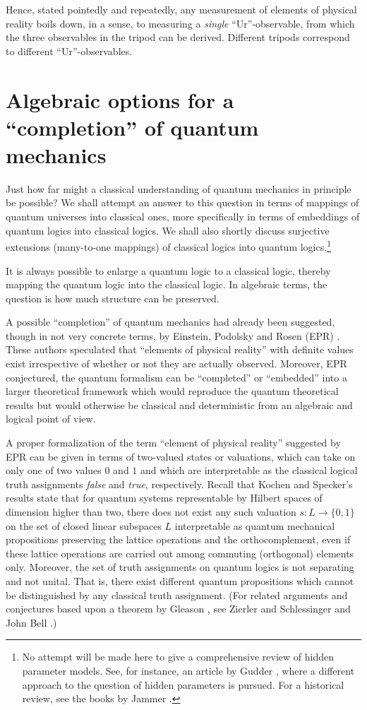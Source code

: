 \documentclass[%
  preprint,
 showpacs,
 showkeys,
 preprintnumbers,
 amsmath,amssymb,
 aps,
 rmp,
  longbibliography,
 ]{revtex4-1}
\begin{document}
Hence, stated pointedly and repeatedly, any measurement of elements of
physical reality boils down, in
a sense, to measuring a {\em single} ``Ur''-observable, from which the
three observables in the tripod can be derived. Different tripods
correspond to different ``Ur''-observables.

\section{Algebraic options for a ``completion'' of quantum mechanics}
Just how far might a classical understanding of quantum mechanics in
principle be possible?  We shall attempt an answer to this question in
terms of mappings of quantum universes into classical ones, more
specifically in terms of embeddings of quantum logics into classical
logics. We shall also shortly discuss surjective extensions (many-to-one
mappings) of classical logics into quantum logics.\footnote{
No attempt will be made here to give a comprehensive review of hidden
parameter models. See, for instance, an article by
Gudder
\cite{gudder1}, where
a different approach to the question of hidden parameters is pursued.
For a historical review, see the books by Jammer
\cite{jammer:66,jammer1}.}

It is always possible to enlarge a quantum logic to a classical
logic, thereby mapping the quantum logic into the classical logic. In
algebraic terms, the question  is how much structure can be preserved.

A possible ``completion'' of quantum mechanics had already been
suggested, though in not very
concrete terms, by Einstein, Podolsky and Rosen (EPR) \cite{epr}. These authors
speculated that ``elements of physical reality'' with definite values
exist irrespective
of whether or not they are actually observed. Moreover, EPR conjectured,
the
quantum formalism can be ``completed'' or ``embedded'' into a larger theoretical framework
which would reproduce the quantum theoretical results but would otherwise
be classical and deterministic from an algebraic and logical point of view.

A proper formalization of the term ``element of physical reality''
suggested by EPR can be given in terms of two-valued states or valuations,
which can take on only one of two values $0$ and $1$ and which are
interpretable as the classical logical truth assignments {\it false} and
{\it true}, respectively.  Recall that Kochen and Specker's results
\cite{kochen1} state that for quantum systems representable by Hilbert
spaces of dimension higher than two, there does not exist any such valuation
$s: L\rightarrow \{0,1\}$
on the set of closed linear subspaces $L$ interpretable as quantum
mechanical propositions preserving the lattice operations
and the orthocomplement,
even if these lattice operations are carried out among commuting
(orthogonal) elements only. Moreover,
the set of truth assignments on quantum logics is not
separating and not unital. That is, there exist  different quantum propositions
which cannot be distinguished by any classical truth assignment.
(For related arguments
and conjectures based upon a theorem by Gleason \cite{Gleason}, see
Zierler and Schlessinger \cite{ZirlSchl-65} and John Bell
\cite{bell-66}.)
\end{document}

